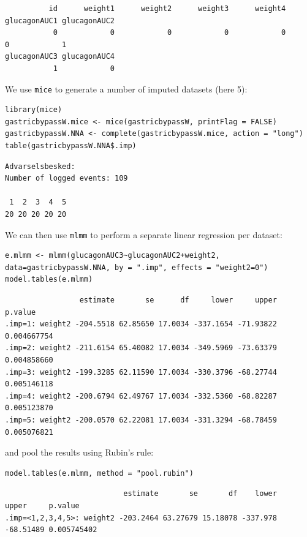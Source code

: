 \documentclass[12pt]{article}
\begin{document}
\begin{verbatim}
          id      weight1      weight2      weight3      weight4 glucagonAUC1 glucagonAUC2 
           0            0            0            0            0            0            1 
glucagonAUC3 glucagonAUC4 
           1            0
\end{verbatim}


We use \texttt{mice} to generate a number of imputed datasets (here 5):
\lstset{language=r,label= ,caption= ,captionpos=b,numbers=none}
\begin{lstlisting}
library(mice)
gastricbypassW.mice <- mice(gastricbypassW, printFlag = FALSE)
gastricbypassW.NNA <- complete(gastricbypassW.mice, action = "long")
table(gastricbypassW.NNA$.imp)
\end{lstlisting}

\begin{verbatim}
Advarselsbesked:
Number of logged events: 109

 1  2  3  4  5 
20 20 20 20 20
\end{verbatim}


We can then use \texttt{mlmm} to perform a separate linear regression per dataset:
\lstset{language=r,label= ,caption= ,captionpos=b,numbers=none}
\begin{lstlisting}
e.mlmm <- mlmm(glucagonAUC3~glucagonAUC2+weight2, data=gastricbypassW.NNA, by = ".imp", effects = "weight2=0")
model.tables(e.mlmm)
\end{lstlisting}

\begin{verbatim}
                 estimate       se      df     lower     upper     p.value
.imp=1: weight2 -204.5518 62.85650 17.0034 -337.1654 -71.93822 0.004667754
.imp=2: weight2 -211.6154 65.40082 17.0034 -349.5969 -73.63379 0.004858660
.imp=3: weight2 -199.3285 62.11590 17.0034 -330.3796 -68.27744 0.005146118
.imp=4: weight2 -200.6794 62.49767 17.0034 -332.5360 -68.82287 0.005123870
.imp=5: weight2 -200.0570 62.22081 17.0034 -331.3294 -68.78459 0.005076821
\end{verbatim}


and pool the results using Rubin's rule:
\lstset{language=r,label= ,caption= ,captionpos=b,numbers=none}
\begin{lstlisting}
model.tables(e.mlmm, method = "pool.rubin")
\end{lstlisting}

\begin{verbatim}
                           estimate       se       df    lower     upper     p.value
.imp=<1,2,3,4,5>: weight2 -203.2464 63.27679 15.18078 -337.978 -68.51489 0.005745402
\end{verbatim}
\end{document}
